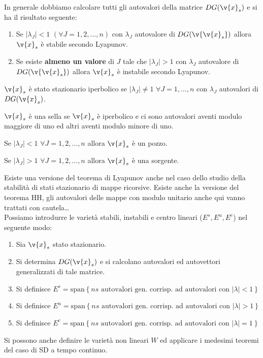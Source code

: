 \noindent
In generale dobbiamo calcolare tutti gli autovalori della matrice $DG(\v{x}_s)$ e si ha il risultato seguente:
\begin{enumerate}
    \item Se  $\left|\lambda_J\right| < 1$ $(\forall J = 1, 2, \ldots, n)$ con $\lambda_J$ autovalore di $DG(\v{\v{x}_s})$ allora $\v{x}_s$ è stabile secondo Lyapunov.
    \item Se esiste \textbf{almeno un valore} di $J$ tale che $\left|\lambda_J\right| > 1$ con $\lambda_J$ autovalore di $DG(\v{\v{x}_s})$ allora $\v{x}_s$ è instabile secondo Lyapunov.
\end{enumerate}
\begin{defn}
    $\v{x}_s$ è stato stazionario iperbolico se $\left|\lambda_J\right|\neq 1$ $\forall J=1, \ldots, n$ con $\lambda_J$ autovalori di $DG(\v{x}_s)$.
\end{defn}
\noindent
\begin{defn}[Sella]
    $\v{x}_s$ è una sella se $\v{x}_s$ è iperbolico e ci sono autovalori aventi modulo maggiore di uno ed altri aventi modulo minore di uno.
\end{defn}
\noindent
\begin{defn}[Pozzo]
    Se $\left|\lambda_J\right|<1$ $\forall J = 1, 2, \ldots, n$ allora $\v{x}_s$ è un pozzo.
\end{defn}
\noindent
\begin{defn}[Sorgente]
    Se $\left|\lambda_J\right|>1$ $\forall J = 1, 2, \ldots, n$ allora $\v{x}_s$ è una sorgente.
\end{defn}
\noindent
Esiste una versione del teorema di Lyapunov anche nel caso dello studio della stabilità di stati stazionario di mappe ricorsive.
Esiste anche la versione del teorema HH, gli autovalori delle mappe con modulo unitario anche qui vanno trattati con cautela\ldots \\
Possiamo introdurre le varietà stabili, instabili e centro lineari ($E^s, E^u, E^c$) nel seguente modo:
\begin{enumerate}
    \item Sia $\v{x}_s$ stato stazionario.
    \item Si determina $DG(\v{x}_s)$ e si calcolano autovalori ed autovettori generalizzati di tale matrice.
    \item Si definisce $E^s = \text{span}\left\{ns 
	\text{ autovalori gen. corrisp. ad autovalori con } \left|\lambda\right|<1\right\}$ 
    \item Si definisce $E^u = \text{span}\left\{ns 
	\text{ autovalori gen. corrisp. ad autovalori con } \left|\lambda\right|>1\right\}$ 
    \item Si definisce $E^c = \text{span}\left\{ns 
	\text{ autovalori gen. corrisp. ad autovalori con } \left|\lambda\right|=1\right\}$ 
\end{enumerate}
Si possono anche definire le varietà non lineari $W$ ed applicare i medesimi teoremi del caso di SD a tempo continuo.\\
